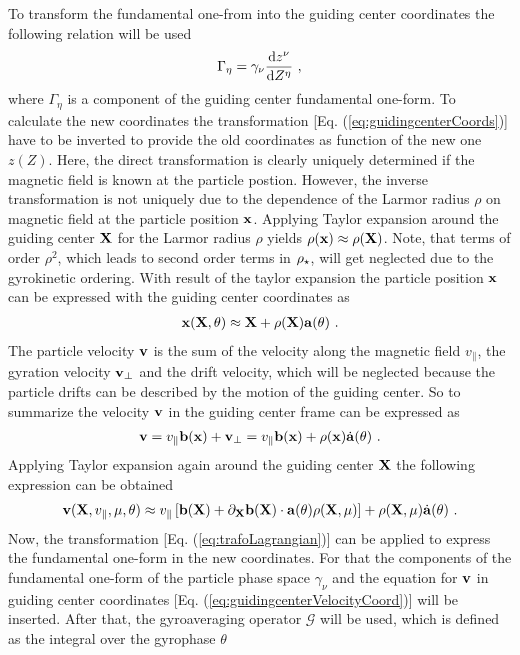 To transform the fundamental one-from into the guiding center coordinates the following relation will be used
\begin{gather}
    \Gamma_\eta = \gamma_\nu \frac{\mathrm{d}z^\nu}{\mathrm{d}Z^\eta}~,
    \label{eq:trafoLagrangian}
\end{gather} 
where $\Gamma_\eta$ is a component of the guiding center fundamental one-form. To calculate the new coordinates the transformation [Eq. (\ref{eq:guidingcenterCoords})] have to be inverted to provide the old coordinates as function of the new one $z(Z)$. Here, the direct transformation is clearly uniquely determined if the magnetic field is known at the particle postion. However, the inverse transformation is not uniquely due to the dependence of the Larmor radius $\rho$ on magnetic field at the particle position $\boldsymbol{\mathbf{x}}$. Applying Taylor expansion around the guiding center $\boldsymbol{\mathbf{X}}$ for the Larmor radius $\rho$ yields $\rho(\boldsymbol{\mathbf{x}}) \approx \rho(\boldsymbol{\mathbf{X}})$. Note, that terms of order $\rho^2$, which leads to second order terms in $\rho_\star$, will get neglected due to the gyrokinetic ordering. With result of the taylor expansion the particle position $\boldsymbol{\mathbf{x}}$ can be expressed with the guiding center coordinates as 
\begin{gather}
    \boldsymbol{\mathbf{x}}(\boldsymbol{\mathbf{X}},\theta) \approx \boldsymbol{\mathbf{X}} + \rho(\boldsymbol{\mathbf{X}})\boldsymbol{\mathbf{a}}(\theta)~.
    \label{eq:guidingcenterParticleCoord}
\end{gather}
The particle velocity $\boldsymbol{\mathbf{v}}$ is the sum of the velocity along the magnetic field $v_\parallel$, the gyration velocity $\boldsymbol{\mathbf{v}}_\perp$ and the drift velocity, which will be neglected because the particle drifts can be described by the motion of the guiding center. So to summarize the velocity $\boldsymbol{\mathbf{v}}$ in the guiding center frame can be expressed as 
\begin{gather}
    \boldsymbol{\mathbf{v}} = v_\parallel \boldsymbol{\mathbf{b}}(\boldsymbol{\mathbf{x}}) + \boldsymbol{\mathbf{v}}_\perp = v_\parallel \boldsymbol{\mathbf{b}}(\boldsymbol{\mathbf{x}}) + \rho(\boldsymbol{\mathbf{x}}) \dot{\boldsymbol{\mathbf{a}}}(\theta)~.
    \label{eq:guidingcenterVelocity}
\end{gather}
Applying Taylor expansion again around the guiding center $\boldsymbol{\mathbf{X}}$ the following expression can be obtained
\begin{gather}
    \boldsymbol{\mathbf{v}}(\boldsymbol{\mathbf{X}}, v_\parallel, \mu, \theta) \approx v_\parallel \left[\boldsymbol{\mathbf{b}}(\boldsymbol{\mathbf{X}}) + \partial_{\boldsymbol{\mathbf{X}}} \boldsymbol{\mathbf{b}}(\boldsymbol{\mathbf{X}}) \cdot \boldsymbol{\mathbf{a}}(\theta)\rho(\boldsymbol{\mathbf{X}},\mu) \right] + \rho(\boldsymbol{\mathbf{X}},\mu)\dot{\boldsymbol{\mathbf{a}}}(\theta)~.
    \label{eq:guidingcenterVelocityCoord}
\end{gather}
Now, the transformation [Eq. (\ref{eq:trafoLagrangian})] can be applied to express the fundamental one-form in the new coordinates. For that the components of the fundamental one-form of the particle phase space $\gamma_\nu$ and the equation for $\boldsymbol{\mathbf{v}}$ in guiding center coordinates [Eq. (\ref{eq:guidingcenterVelocityCoord})] will be inserted. After that, the gyroaveraging operator $\mathcal{G}$ will be used, which is defined as the integral over the gyrophase $\theta$
